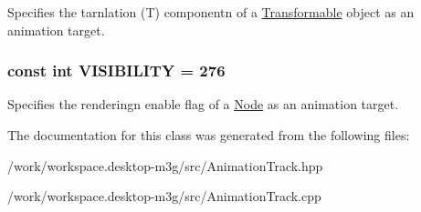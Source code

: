 Specifies the tarnlation (T) componentn of a \hyperlink{classm3g_1_1Transformable}{Transformable} object as an animation target. \hypertarget{classm3g_1_1AnimationTrack_f248c44b5d4962472c6533cdeffc6fe9}{
\subsubsection[{VISIBILITY}]{\setlength{\rightskip}{0pt plus 5cm}const int {\bf VISIBILITY} = 276}}
\label{classm3g_1_1AnimationTrack_f248c44b5d4962472c6533cdeffc6fe9}


Specifies the renderingn enable flag of a \hyperlink{classm3g_1_1Node}{Node} as an animation target. 

The documentation for this class was generated from the following files:\begin{CompactItemize}
\item 
/work/workspace.desktop-m3g/src/AnimationTrack.hpp\item 
/work/workspace.desktop-m3g/src/AnimationTrack.cpp\end{CompactItemize}
